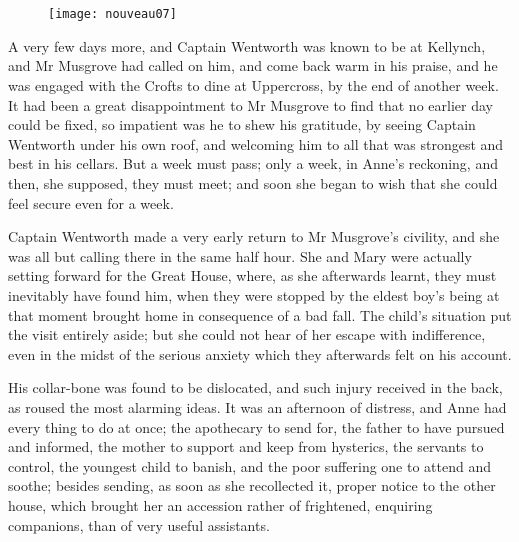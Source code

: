 \chapter[Chapter \thechapter]{}

\begin{figure}[t!]
\centering
\texttt{[image: nouveau07]}
\end{figure}

\lettrine[lraise=0.3]{A}{} very few days more, and Captain Wentworth was known to be at Kellynch, and Mr Musgrove had called on him, and come back warm in his praise, and he was engaged with the Crofts to dine at Uppercross, by the end of another week. It had been a great disappointment to Mr Musgrove to find that no earlier day could be fixed, so impatient was he to shew his gratitude, by seeing Captain Wentworth under his own roof, and welcoming him to all that was strongest and best in his cellars. But a week must pass; only a week, in Anne's reckoning, and then, she supposed, they must meet; and soon she began to wish that she could feel secure even for a week.

Captain Wentworth made a very early return to Mr Musgrove's civility, and she was all but calling there in the same half hour. She and Mary were actually setting forward for the Great House, where, as she afterwards learnt, they must inevitably have found him, when they were stopped by the eldest boy's being at that moment brought home in consequence of a bad fall. The child's situation put the visit entirely aside; but she could not hear of her escape with indifference, even in the midst of the serious anxiety which they afterwards felt on his account.

His collar-bone was found to be dislocated, and such injury received in the back, as roused the most alarming ideas. It was an afternoon of distress, and Anne had every thing to do at once; the apothecary to send for, the father to have pursued and informed, the mother to support and keep from hysterics, the servants to control, the youngest child to banish, and the poor suffering one to attend and soothe; besides sending, as soon as she recollected it, proper notice to the other house, which brought her an accession rather of frightened, enquiring companions, than of very useful assistants.

